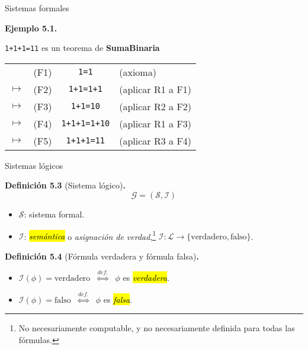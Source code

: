 \documentclass[10pt,xcolor=dvipsnames,aspectratio=169,spanish]{beamer}
\makeatletter
\let\HL\hl
\renewcommand\hl{%
  \let\set@color\beamerorig@set@color
  \let\reset@color\beamerorig@reset@color
  \HL}
\newcommand{\hle}[1]{\hl{\emph{#1}}}
\makeatother
\begin{document}
\begin{frame}{Sistemas formales}

\textbf{Ejemplo 5.1.}

\begin{center}
    \texttt{1+1+1=11} es un teorema de \textbf{SumaBinaria}
\end{center}

\begin{table}[h]
\centering
\begin{tabular}{lrcl}
& (F1) & \texttt{1=1} & (axioma) \\
$\mapsto$ & (F2) & \texttt{1+1=1+1} & (aplicar R1 a F1) \\
$\mapsto$ & (F3) & \texttt{1+1=10} & (aplicar R2 a F2) \\
$\mapsto$ & (F4) & \texttt{1+1+1=1+10} & (aplicar R1 a F3) \\
$\mapsto$ & (F5) & \texttt{1+1+1=11} & (aplicar R3 a F4) \\
\end{tabular}
\end{table}

\end{frame}

\begin{frame}{Sistemas lógicos}


\textbf{Definición 5.3} (Sistema lógico)\textbf{.}
{\Large $$\mathcal{G} = (\mathcal{S}, \mathcal{I})$$}
\vspace*{-5mm}
\begin{itemize}
    \item $\mathcal{S}$: sistema formal.
    \item $\mathcal{I}$: \hle{semántica} o \emph{asignación de verdad},\footnote{No necesariamente computable, y no necesariamente definida para todas las fórmulas.} $\mathcal{I}:\mathcal{L}\longrightarrow\{\text{verdadero}, \text{falso}\}$.
\end{itemize}

\vspace{5mm}

\textbf{Definición 5.4} (Fórmula verdadera y fórmula falsa)\textbf{.}

\begin{itemize}
    \item $\mathcal{I}(\phi)=\text{verdadero}$ $\;\stackrel{def.}{\iff}\;$ $\phi$ es \hle{verdadera}.
    \item $\mathcal{I}(\phi)=\text{falso}$ $\;\stackrel{def.}{\iff}\;$ $\phi$ es \hle{falsa}.
\end{itemize}

\end{frame}
\end{document}
